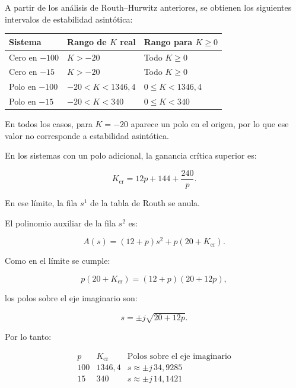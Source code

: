 \documentclass[12pt,a4paper]{article}
\begin{document}
A partir de los análisis de Routh--Hurwitz anteriores,
se obtienen los siguientes intervalos de estabilidad
asintótica:

\begin{center}
\small

\begin{tabular}{lll}
\toprule

Sistema
& Rango de $K$ real
& Rango para $K\geq0$
\\

\midrule

Cero en $-100$
& $K>-20$
& Todo $K\geq0$
\\

Cero en $-15$
& $K>-20$
& Todo $K\geq0$
\\

Polo en $-100$
& $-20<K<1346{,}4$
& $0\leq K<1346{,}4$
\\

Polo en $-15$
& $-20<K<340$
& $0\leq K<340$
\\

\bottomrule
\end{tabular}

\end{center}

En todos los casos, para $K=-20$ aparece un polo en el
origen, por lo que ese valor no corresponde a estabilidad
asintótica.

En los sistemas con un polo adicional, la ganancia
crítica superior es:

\[
K_{\mathrm{cr}}
=
12p+144+\frac{240}{p}.
\]

En ese límite, la fila $s^1$ de la tabla de Routh se
anula.

El polinomio auxiliar de la fila $s^2$ es:

\[
A(s)
=
(12+p)s^2+p(20+K_{\mathrm{cr}}).
\]

Como en el límite se cumple:

\[
p(20+K_{\mathrm{cr}})
=
(12+p)(20+12p),
\]

los polos sobre el eje imaginario son:

\[
s
=
\pm j\sqrt{20+12p}.
\]

Por lo tanto:

\[
\begin{array}{c|c|c}
p
&
K_{\mathrm{cr}}
&
\text{Polos sobre el eje imaginario}
\\
\hline

100
&
1346{,}4
&
s\approx\pm j\,34{,}9285
\\

15
&
340
&
s\approx\pm j\,14{,}1421
\end{array}
\]
\end{document}
